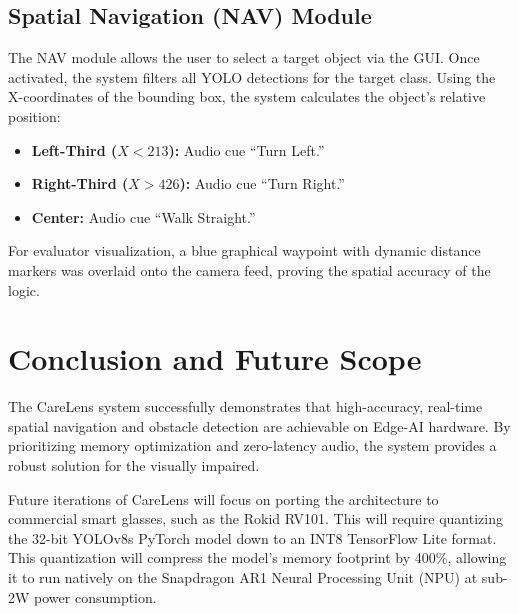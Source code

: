 \documentclass[conference]{IEEEtran}
\begin{document}
\subsection{Spatial Navigation (NAV) Module}
The NAV module allows the user to select a target object via the GUI. Once activated, the system filters all YOLO detections for the target class. Using the X-coordinates of the bounding box, the system calculates the object's relative position:
\begin{itemize}
    \item \textbf{Left-Third ($X < 213$):} Audio cue ``Turn Left.''
    \item \textbf{Right-Third ($X > 426$):} Audio cue ``Turn Right.''
    \item \textbf{Center:} Audio cue ``Walk Straight.''
\end{itemize}
For evaluator visualization, a blue graphical waypoint with dynamic distance markers was overlaid onto the camera feed, proving the spatial accuracy of the logic.

\section{Conclusion and Future Scope}
The CareLens system successfully demonstrates that high-accuracy, real-time spatial navigation and obstacle detection are achievable on Edge-AI hardware. By prioritizing memory optimization and zero-latency audio, the system provides a robust solution for the visually impaired.

Future iterations of CareLens will focus on porting the architecture to commercial smart glasses, such as the Rokid RV101. This will require quantizing the 32-bit YOLOv8s PyTorch model down to an INT8 TensorFlow Lite format. This quantization will compress the model's memory footprint by 400\%, allowing it to run natively on the Snapdragon AR1 Neural Processing Unit (NPU) at sub-2W power consumption.
\end{document}
